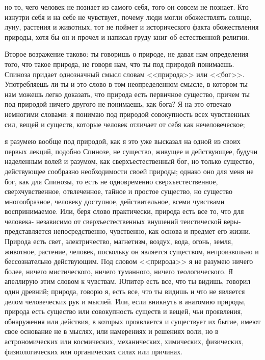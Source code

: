 \documentclass[12pt]{article}
\begin{document}
но то, чего человек не познает из самого себя, того он совсем не познает. Кто изнутри себя и на себе не чувствует, почему люди могли обожествлять солнце, луну, растения и животных, тот не поймет и исторического факта обожествления природы, хотя бы он и прочел и написал груду книг об естественной религии. 

Второе возражение таково: ты говоришь о природе, не давая нам определения того, что такое природа, не говоря нам, что ты под природой понимаешь. Спиноза придает однозначный смысл словам <<природа>>  или <<бог>>. Употребляешь ли ты и это слово в том неопределенном смысле, в котором ты нам можешь легко доказать, что природа есть первичное существо, причем ты под природой ничего другого не понимаешь, как бога? Я на это отвечаю немногими словами: я понимаю под природой совокупность всех чувственных сил, вещей и существ, которые человек отличает от себя как нечеловеческое; 

я разумею вообще под природой, как я это уже высказал на одной из своих первых лекций, подобно Спинозе, не существо, живущее и действующее, будучи наделенным волей и разумом, как сверхъестественный бог, но только существо, действующее сообразно необходимости своей природы; однако оно для меня не бог, как для Спинозы, то есть не одновременно сверхъестественное, сверхчувственное, отвлеченное, тайное и простое существо, но существо многообразное, человеку доступное, действительное, всеми чувствами воспринимаемое. Или, беря слово практически, природа есть все то, что для человека- независимо от сверхъестественных внушений теистической веры-представляется непосредственно, чувственно, как основа и предмет его жизни. Природа есть свет, электричество, магнетизм, воздух, вода, огонь, земля, животное, растение, человек, поскольку он является существом, непроизвольно и бессознательно действующим. Под словом <<природа>> я не разумею ничего более, ничего мистического, ничего туманного, ничего теологического. Я апеллирую этим словом к чувствам. Юпитер есть все, что ты видишь, говорил один древний; природа, говорю я, есть все, что ты видишь и что не является делом человеческих рук и мыслей. Или, если вникнуть в анатомию природы, природа есть существо или совокупность существ и вещей, чьи проявления, обнаружения или действия, в которых проявляется и существует их бытие, имеют свое основание не в мыслях, или намерениях и решениях воли, но в астрономических или космических, механических, химических, физических, физиологических или органических силах или причинах. 
\end{document}
